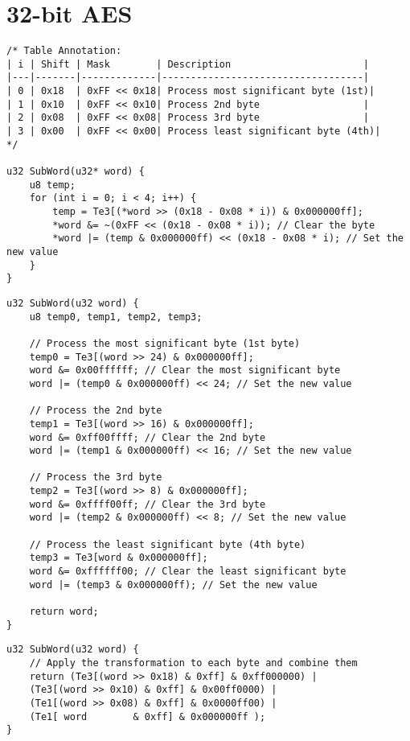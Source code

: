\chapter{32-bit AES}

\begin{lstlisting}[style=C, caption={SubWord applies the S-box to each byte of the input word},captionpos=t]
/* Table Annotation:
| i | Shift | Mask        | Description                       |
|---|-------|-------------|-----------------------------------|
| 0 | 0x18  | 0xFF << 0x18| Process most significant byte (1st)|
| 1 | 0x10  | 0xFF << 0x10| Process 2nd byte                  |
| 2 | 0x08  | 0xFF << 0x08| Process 3rd byte                  |
| 3 | 0x00  | 0xFF << 0x00| Process least significant byte (4th)|
*/

u32 SubWord(u32* word) {
	u8 temp;
	for (int i = 0; i < 4; i++) {
		temp = Te3[(*word >> (0x18 - 0x08 * i)) & 0x000000ff];
		*word &= ~(0xFF << (0x18 - 0x08 * i)); // Clear the byte
		*word |= (temp & 0x000000ff) << (0x18 - 0x08 * i); // Set the new value
	}
}
\end{lstlisting}

\newpage
\begin{lstlisting}[style=C, caption={SubWord applies the S-box to each byte of the input word},captionpos=t]
u32 SubWord(u32 word) {
	u8 temp0, temp1, temp2, temp3;
	
	// Process the most significant byte (1st byte)
	temp0 = Te3[(word >> 24) & 0x000000ff];
	word &= 0x00ffffff; // Clear the most significant byte
	word |= (temp0 & 0x000000ff) << 24; // Set the new value
	
	// Process the 2nd byte
	temp1 = Te3[(word >> 16) & 0x000000ff];
	word &= 0xff00ffff; // Clear the 2nd byte
	word |= (temp1 & 0x000000ff) << 16; // Set the new value
	
	// Process the 3rd byte
	temp2 = Te3[(word >> 8) & 0x000000ff];
	word &= 0xffff00ff; // Clear the 3rd byte
	word |= (temp2 & 0x000000ff) << 8; // Set the new value
	
	// Process the least significant byte (4th byte)
	temp3 = Te3[word & 0x000000ff];
	word &= 0xffffff00; // Clear the least significant byte
	word |= (temp3 & 0x000000ff); // Set the new value
	
	return word;
}

\end{lstlisting}


\begin{lstlisting}[style=C, caption={SubWord applies the S-box to each byte of the input word},captionpos=t]
u32 SubWord(u32 word) {
	// Apply the transformation to each byte and combine them
	return (Te3[(word >> 0x18) & 0xff] & 0xff000000) |
	(Te3[(word >> 0x10) & 0xff] & 0x00ff0000) |
	(Te1[(word >> 0x08) & 0xff] & 0x0000ff00) |
	(Te1[ word        & 0xff] & 0x000000ff );
}
\end{lstlisting}